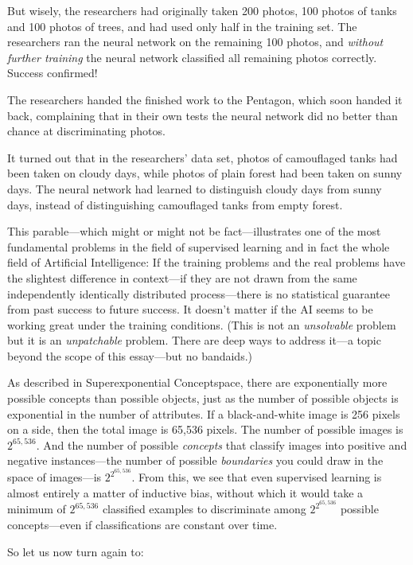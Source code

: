 {
 But wisely, the researchers had originally taken 200 photos, 100
photos of tanks and 100 photos of trees, and had used only half in the
training set. The researchers ran the neural network on the remaining
100 photos, and \textit{without further training} the neural network
classified all remaining photos correctly. Success confirmed!}

{
 The researchers handed the finished work to the Pentagon, which
soon handed it back, complaining that in their own tests the neural
network did no better than chance at discriminating photos.}

{
 It turned out that in the researchers' data set,
photos of camouflaged tanks had been taken on cloudy days, while photos
of plain forest had been taken on sunny days. The neural network had
learned to distinguish cloudy days from sunny days, instead of
distinguishing camouflaged tanks from empty forest.}

{
 This parable---which might or might not be fact---illustrates one
of the most fundamental problems in the field of supervised learning
and in fact the whole field of Artificial Intelligence: If the training
problems and the real problems have the slightest difference in
context---if they are not drawn from the same independently identically
distributed process---there is no statistical guarantee from past
success to future success. It doesn't matter if the AI
seems to be working great under the training conditions. (This is not
an \textit{unsolvable} problem but it is an \textit{unpatchable}
problem. There are deep ways to address it---a topic beyond the scope
of this essay---but no bandaids.)}

{
 As described in Superexponential Conceptspace, there are
exponentially more possible concepts than possible objects, just as the
number of possible objects is exponential in the number of attributes.
If a black-and-white image is 256 pixels on a side, then the total
image is 65,536 pixels. The number of possible images is
$2^{65,536}$. And the number of possible \textit{concepts}
that classify images into positive and negative instances---the number
of possible \textit{boundaries} you could draw in the space of
images---is $2^{2^{65,536}}$. From this, we see that even
supervised learning is almost entirely a matter of inductive bias,
without which it would take a minimum of $2^{65,536}$
classified examples to discriminate among $2^{2^{65,536}}$
possible concepts---even if classifications are constant over time.}

{
 So let us now turn again to:}

